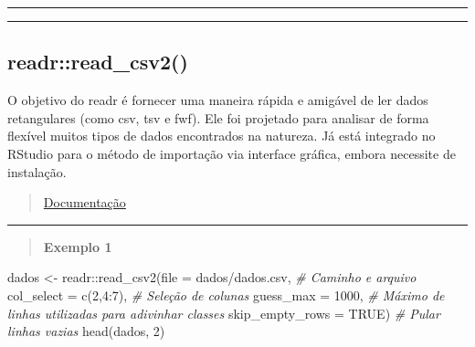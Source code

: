 \documentclass[
]{book}
\newenvironment{Shaded}{\begin{snugshade}}{\end{snugshade}}
\newcommand{\AttributeTok}[1]{\textcolor[rgb]{0.77,0.63,0.00}{#1}}
\newcommand{\CommentTok}[1]{\textcolor[rgb]{0.56,0.35,0.01}{\textit{#1}}}
\newcommand{\ConstantTok}[1]{\textcolor[rgb]{0.00,0.00,0.00}{#1}}
\newcommand{\DecValTok}[1]{\textcolor[rgb]{0.00,0.00,0.81}{#1}}
\newcommand{\FunctionTok}[1]{\textcolor[rgb]{0.00,0.00,0.00}{#1}}
\newcommand{\NormalTok}[1]{#1}
\newcommand{\OtherTok}[1]{\textcolor[rgb]{0.56,0.35,0.01}{#1}}
\newcommand{\SpecialCharTok}[1]{\textcolor[rgb]{0.00,0.00,0.00}{#1}}
\newcommand{\StringTok}[1]{\textcolor[rgb]{0.31,0.60,0.02}{#1}}
\theoremstyle{definition}
\theoremstyle{definition}
\theoremstyle{definition}
\theoremstyle{definition}
\theoremstyle{remark}
\begin{document}
\begin{center}\rule{0.5\linewidth}{0.5pt}\end{center}

\begin{center}\rule{0.5\linewidth}{0.5pt}\end{center}

\hypertarget{readrread_csv2}{%
\subsection{readr::read\_csv2()}\label{readrread_csv2}}

O objetivo do readr é fornecer uma maneira rápida e amigável de ler dados retangulares (como csv, tsv e fwf). Ele foi projetado para analisar de forma flexível muitos tipos de dados encontrados na natureza. Já está integrado no RStudio para o método de importação via interface gráfica, embora necessite de instalação.

\begin{quote}
\href{https://www.rdocumentation.org/packages/readr/versions/1.3.1}{Documentação}
\end{quote}

\begin{center}\rule{0.5\linewidth}{0.5pt}\end{center}

\begin{quote}
\textbf{Exemplo 1}
\end{quote}

\begin{Shaded}
\begin{Highlighting}[]
\NormalTok{dados }\OtherTok{\textless{}{-}}\NormalTok{ readr}\SpecialCharTok{::}\FunctionTok{read\_csv2}\NormalTok{(}\AttributeTok{file =} \StringTok{\textquotesingle{}dados/dados.csv\textquotesingle{}}\NormalTok{,  }\CommentTok{\# Caminho e arquivo}
                          \AttributeTok{col\_select =} \FunctionTok{c}\NormalTok{(}\DecValTok{2}\NormalTok{,}\DecValTok{4}\SpecialCharTok{:}\DecValTok{7}\NormalTok{),     }\CommentTok{\# Seleção de colunas}
                          \AttributeTok{guess\_max =} \DecValTok{1000}\NormalTok{,          }\CommentTok{\# Máximo de linhas utilizadas para adivinhar classes}
                          \AttributeTok{skip\_empty\_rows =} \ConstantTok{TRUE}\NormalTok{)    }\CommentTok{\# Pular linhas vazias}
\FunctionTok{head}\NormalTok{(dados, }\DecValTok{2}\NormalTok{)                                       }
\end{Highlighting}
\end{Shaded}
\end{document}
